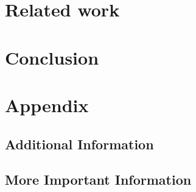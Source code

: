 \documentclass[ms,english]{stthesis}
\begin{document}
    \chapter{Related work}


    \chapter{Conclusion}
        \lipsum[1]

    \backmatter
    
    \appendix
    \chapter{Appendix}
    \section{Additional Information}
    \lipsum[1]
    
    \section{More Important Information}
    \lipsum[1]
  
\end{document}

